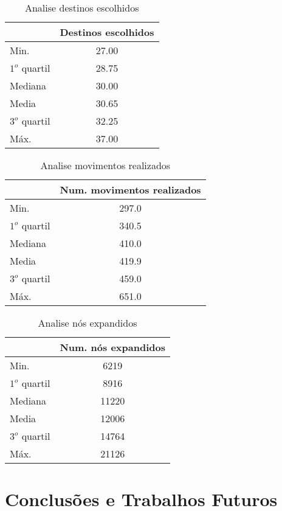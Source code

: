 \documentclass[12pt]{article}
\begin{document}
\begin{table}[h]
	\centering
	\begin{tabular}{|l|c|}
	\hline
	& Destinos escolhidos \\ \hline
	Min. & 27.00 \\ \hline
	$1^{o}$ quartil & 28.75 \\ \hline
	Mediana & 30.00 \\ \hline
	Media & 30.65 \\ \hline
	$3^{o}$ quartil & 32.25 \\ \hline
	Máx. & 37.00 \\ \hline
	\end{tabular}
	\caption{Analise destinos escolhidos}
	\label{tabela:destinos}
\end{table}


\begin{table}[h]
	\centering
	\begin{tabular}{|l|c|}
	\hline
	& Num. movimentos realizados \\ \hline
	Min. & 297.0 \\ \hline
	$1^{o}$ quartil & 340.5 \\ \hline
	Mediana & 410.0 \\ \hline
	Media & 419.9 \\ \hline
	$3^{o}$ quartil & 459.0 \\ \hline
	Máx. & 651.0 \\ \hline
	\end{tabular}
	\caption{Analise movimentos realizados}
	\label{tabela:movimentos}
\end{table}


\begin{table}[h]
	\centering
	\begin{tabular}{|l|c|}
	\hline
	& Num. nós expandidos \\ \hline
	Min. & 6219 \\ \hline
	$1^{o}$ quartil & 8916 \\ \hline
	Mediana & 11220 \\ \hline
	Media & 12006 \\ \hline
	$3^{o}$ quartil & 14764 \\ \hline
	Máx. & 21126 \\ \hline
	\end{tabular}
	\caption{Analise nós expandidos}
	\label{tabela:nosExpandidos}
\end{table}
\section{Conclusões e Trabalhos Futuros} \label{sec:Conclusoes}



\end{document}
